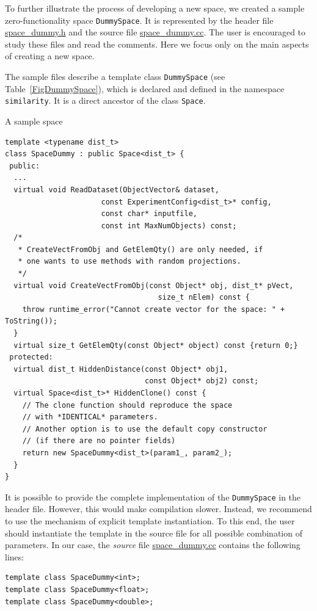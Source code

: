 \documentclass[runningheads,a4paper]{llncs}
\newcommand{\replocfile}{https://github.com/searchivarius/NonMetricSpaceLib/blob/develop/}
\newcommand{\ttt}[1]{\texttt{#1}}
\begin{document}
To further illustrate the process of developing a new space,
we created a sample zero-functionality space \ttt{DummySpace}.
It is represented by 
the header file 
\href{\replocfile  similarity_search/include/space/space_dummy.h}{space\_dummy.h}
and the source file
\href{\replocfile similarity_search/src/space/space_dummy.cc}{space\_dummy.cc}.
The user is encouraged to study these files and read the comments.
Here we focus only on the main aspects of creating a new space.

The sample files describe a template class \ttt{DummySpace} (see Table~\ref{FigDummySpace}), 
which is declared and defined in the namespace \ttt{similarity}.
It is a direct ancestor of the class \ttt{Space}.

\begin{table}[t]
\caption{\label{FigDummySpace}A sample space}
\begin{verbatim}
template <typename dist_t>
class SpaceDummy : public Space<dist_t> {
 public:
  ...
  virtual void ReadDataset(ObjectVector& dataset,
                      const ExperimentConfig<dist_t>* config,
                      const char* inputfile,
                      const int MaxNumObjects) const;
  /*
   * CreateVectFromObj and GetElemQty() are only needed, if
   * one wants to use methods with random projections.
   */
  virtual void CreateVectFromObj(const Object* obj, dist_t* pVect,
                                   size_t nElem) const {
    throw runtime_error("Cannot create vector for the space: " + ToString());
  }
  virtual size_t GetElemQty(const Object* object) const {return 0;}
 protected:
  virtual dist_t HiddenDistance(const Object* obj1, 
                                const Object* obj2) const;
  virtual Space<dist_t>* HiddenClone() const {
    // The clone function should reproduce the space 
    // with *IDENTICAL* parameters. 
    // Another option is to use the default copy constructor 
    // (if there are no pointer fields)
    return new SpaceDummy<dist_t>(param1_, param2_);
  }
}
\end{verbatim}
\end{table}

It is possible to provide the complete implementation of the \ttt{DummySpace}
in the header file. However, this would make compilation slower.
Instead, we recommend to use the mechanism of explicit template instantiation.
To this end, the user should instantiate the template in the source file
for all possible combination of parameters.
In our case, the \emph{source} file 
\href{\replocfile similarity_search/src/space/space_dummy.cc}{space\_dummy.cc}
contains the following lines:
\begin{verbatim}
template class SpaceDummy<int>;
template class SpaceDummy<float>;
template class SpaceDummy<double>;
\end{verbatim}
\end{document}
